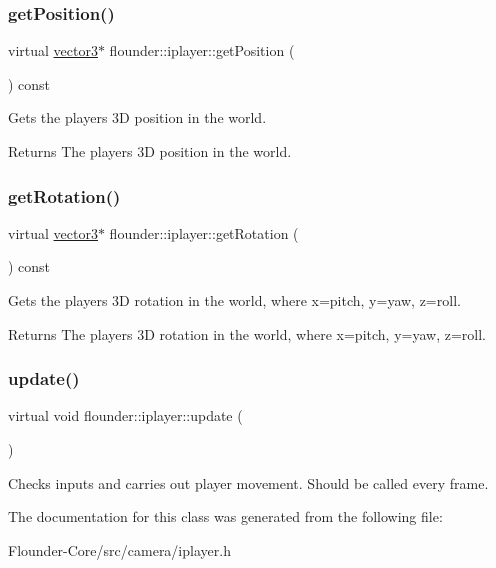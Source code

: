 \subsubsection{\texorpdfstring{get\+Position()}{getPosition()}}
{\footnotesize\ttfamily virtual \hyperlink{classflounder_1_1vector3}{vector3}$\ast$ flounder\+::iplayer\+::get\+Position (\begin{DoxyParamCaption}{ }\end{DoxyParamCaption}) const\hspace{0.3cm}{\ttfamily [pure virtual]}}



Gets the players 3D position in the world. 

\begin{DoxyReturn}{Returns}
The players 3D position in the world. 
\end{DoxyReturn}
\mbox{\label{classflounder_1_1iplayer_ae86318c75ebf593561cbbd82a94ef822}} 
\subsubsection{\texorpdfstring{get\+Rotation()}{getRotation()}}
{\footnotesize\ttfamily virtual \hyperlink{classflounder_1_1vector3}{vector3}$\ast$ flounder\+::iplayer\+::get\+Rotation (\begin{DoxyParamCaption}{ }\end{DoxyParamCaption}) const\hspace{0.3cm}{\ttfamily [pure virtual]}}



Gets the players 3D rotation in the world, where x=pitch, y=yaw, z=roll. 

\begin{DoxyReturn}{Returns}
The players 3D rotation in the world, where x=pitch, y=yaw, z=roll. 
\end{DoxyReturn}
\mbox{\label{classflounder_1_1iplayer_a763358c47f9d9433b0ce467418492038}} 
\subsubsection{\texorpdfstring{update()}{update()}}
{\footnotesize\ttfamily virtual void flounder\+::iplayer\+::update (\begin{DoxyParamCaption}{ }\end{DoxyParamCaption})\hspace{0.3cm}{\ttfamily [pure virtual]}}



Checks inputs and carries out player movement. Should be called every frame. 



The documentation for this class was generated from the following file\+:\begin{DoxyCompactItemize}
\item 
Flounder-\/\+Core/src/camera/iplayer.\+h\end{DoxyCompactItemize}
